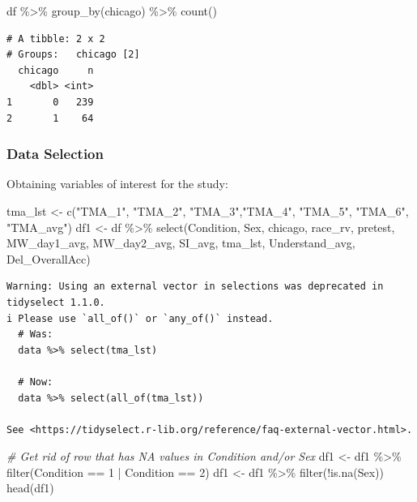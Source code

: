 \documentclass[
  letterpaper,
  DIV=11,
  numbers=noendperiod]{scrartcl}
\newenvironment{Shaded}{\begin{snugshade}}{\end{snugshade}}
\newcommand{\CommentTok}[1]{\textcolor[rgb]{0.38,0.63,0.69}{\textit{#1}}}
\newcommand{\DecValTok}[1]{\textcolor[rgb]{0.25,0.63,0.44}{#1}}
\newcommand{\FunctionTok}[1]{\textcolor[rgb]{0.02,0.16,0.49}{#1}}
\newcommand{\NormalTok}[1]{\textcolor[rgb]{0.00,0.44,0.13}{#1}}
\newcommand{\OtherTok}[1]{\textcolor[rgb]{0.00,0.44,0.13}{#1}}
\newcommand{\SpecialCharTok}[1]{\textcolor[rgb]{0.25,0.44,0.63}{#1}}
\newcommand{\StringTok}[1]{\textcolor[rgb]{0.25,0.44,0.63}{#1}}
\begin{document}
\begin{Shaded}
\begin{Highlighting}[]
\NormalTok{df }\SpecialCharTok{\%\textgreater{}\%} \FunctionTok{group\_by}\NormalTok{(chicago) }\SpecialCharTok{\%\textgreater{}\%} \FunctionTok{count}\NormalTok{()}
\end{Highlighting}
\end{Shaded}

\begin{verbatim}
# A tibble: 2 x 2
# Groups:   chicago [2]
  chicago     n
    <dbl> <int>
1       0   239
2       1    64
\end{verbatim}

\hypertarget{data-selection}{%
\subsubsection{Data Selection}\label{data-selection}}

Obtaining variables of interest for the study:

\begin{Shaded}
\begin{Highlighting}[]
\NormalTok{tma\_lst }\OtherTok{\textless{}{-}} \FunctionTok{c}\NormalTok{(}\StringTok{"TMA\_1"}\NormalTok{, }\StringTok{"TMA\_2"}\NormalTok{, }\StringTok{"TMA\_3"}\NormalTok{,}\StringTok{"TMA\_4"}\NormalTok{, }\StringTok{"TMA\_5"}\NormalTok{, }\StringTok{"TMA\_6"}\NormalTok{,}
             \StringTok{"TMA\_avg"}\NormalTok{)}
\NormalTok{df1 }\OtherTok{\textless{}{-}}\NormalTok{ df }\SpecialCharTok{\%\textgreater{}\%} \FunctionTok{select}\NormalTok{(Condition, Sex, chicago, race\_rv, pretest,}
\NormalTok{              MW\_day1\_avg, MW\_day2\_avg, SI\_avg, tma\_lst,}
\NormalTok{              Understand\_avg, Del\_OverallAcc)}
\end{Highlighting}
\end{Shaded}

\begin{verbatim}
Warning: Using an external vector in selections was deprecated in tidyselect 1.1.0.
i Please use `all_of()` or `any_of()` instead.
  # Was:
  data %>% select(tma_lst)

  # Now:
  data %>% select(all_of(tma_lst))

See <https://tidyselect.r-lib.org/reference/faq-external-vector.html>.
\end{verbatim}

\begin{Shaded}
\begin{Highlighting}[]
\CommentTok{\# Get rid of row that has NA values in Condition and/or Sex}
\NormalTok{df1 }\OtherTok{\textless{}{-}}\NormalTok{ df1 }\SpecialCharTok{\%\textgreater{}\%} \FunctionTok{filter}\NormalTok{(Condition }\SpecialCharTok{==} \DecValTok{1} \SpecialCharTok{|}\NormalTok{ Condition }\SpecialCharTok{==} \DecValTok{2}\NormalTok{)}
\NormalTok{df1 }\OtherTok{\textless{}{-}}\NormalTok{ df1 }\SpecialCharTok{\%\textgreater{}\%} \FunctionTok{filter}\NormalTok{(}\SpecialCharTok{!}\FunctionTok{is.na}\NormalTok{(Sex))}
\FunctionTok{head}\NormalTok{(df1)}
\end{Highlighting}
\end{Shaded}
\end{document}
